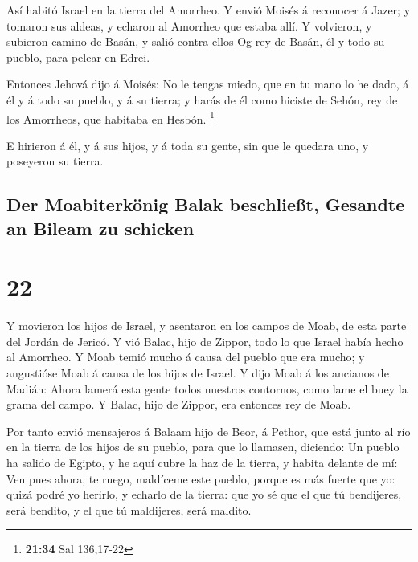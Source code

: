  Así habitó Israel en la tierra del Amorrheo.
 Y envió Moisés á reconocer á Jazer; y tomaron sus
aldeas, y echaron al Amorrheo que estaba allí.  Y
volvieron, y subieron camino de Basán, y salió contra ellos Og rey de
Basán, él y todo su pueblo, para pelear en Edrei.

 Entonces Jehová dijo á Moisés: No le tengas miedo, que
en tu mano lo he dado, á él y á todo su pueblo, y á su tierra; y harás
de él como hiciste de Sehón, rey de los Amorrheos, que habitaba en
Hesbón. \footnote{\textbf{21:34} Sal 136,17-22}

 E hirieron á él, y á sus hijos, y á toda su gente, sin
que le quedara uno, y poseyeron su tierra.

\hypertarget{der-moabiterkuxf6nig-balak-beschlieuxdft-gesandte-an-bileam-zu-schicken}{%
\subsection{Der Moabiterkönig Balak beschließt, Gesandte an Bileam zu
schicken}\label{der-moabiterkuxf6nig-balak-beschlieuxdft-gesandte-an-bileam-zu-schicken}}

\hypertarget{section-21}{%
\section{22}\label{section-21}}

 Y movieron los hijos de Israel, y asentaron en los campos
de Moab, de esta parte del Jordán de Jericó.  Y vió Balac,
hijo de Zippor, todo lo que Israel había hecho al Amorrheo.
 Y Moab temió mucho á causa del pueblo que era mucho; y
angustióse Moab á causa de los hijos de Israel.  Y dijo
Moab á los ancianos de Madián: Ahora lamerá esta gente todos nuestros
contornos, como lame el buey la grama del campo. Y Balac, hijo de
Zippor, era entonces rey de Moab.

 Por tanto envió mensajeros á Balaam hijo de Beor, á
Pethor, que está junto al río en la tierra de los hijos de su pueblo,
para que lo llamasen, diciendo: Un pueblo ha salido de Egipto, y he aquí
cubre la haz de la tierra, y habita delante de mí:  Ven
pues ahora, te ruego, maldíceme este pueblo, porque es más fuerte que
yo: quizá podré yo herirlo, y echarlo de la tierra: que yo sé que el que
tú bendijeres, será bendito, y el que tú maldijeres, será maldito.

